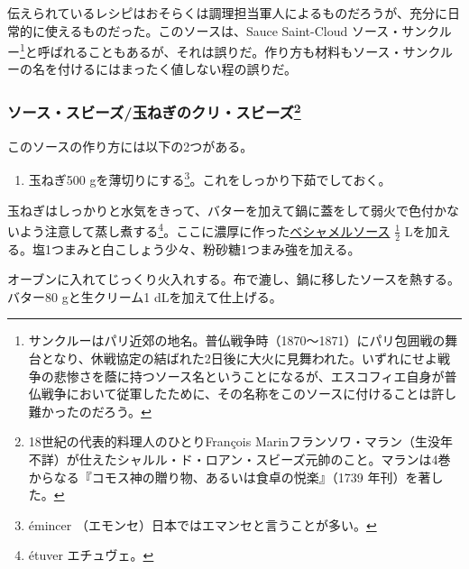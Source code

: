 \begin{recette}
伝えられているレシピはおそらくは調理担当軍人によるものだろうが、充分に日常的に使えるものだった。このソースは、Sauce
Saint-Cloud ソース・サンクルー\footnote{サンクルーはパリ近郊の地名。普仏戦争時（1870〜1871）にパリ包囲戦の舞台となり、休戦協定の結ばれた2日後に大火に見舞われた。いずれにせよ戦争の悲惨さを蔭に持つソース名ということになるが、エスコフィエ自身が普仏戦争において従軍したために、その名称をこのソースに付けることは許し難かったのだろう。}と呼ばれることもあるが、それは誤りだ。作り方も材料もソース・サンクルーの名を付けるにはまったく値しない程の誤りだ。

\atoaki{}

\hypertarget{sauce-soubise}{%
\subsubsection[ソース・スビーズ/玉ねぎのクリ・スビーズ]{\texorpdfstring{ソース・スビーズ/玉ねぎのクリ・スビーズ\footnote{18世紀の代表的料理人のひとりFrançois
  Marinフランソワ・マラン（生没年不詳）が仕えたシャルル・ド・ロアン・スビーズ元帥のこと。マランは4巻からなる『コモス神の贈り物、あるいは食卓の悦楽』（1739
  年刊）を著した。}}{ソース・スビーズ/玉ねぎのクリ・スビーズ}}\label{sauce-soubise}}


 

このソースの作り方には以下の2つがある。

\begin{enumerate}
\def\labelenumi{\arabic{enumi}.}
\tightlist
\item
  玉ねぎ500 gを薄切りにする\footnote{émincer
    （エモンセ）日本ではエマンセと言うことが多い。}。これをしっかり下茹でしておく。
\end{enumerate}

玉ねぎはしっかりと水気をきって、バターを加えて鍋に蓋をして弱火で色付かないよう注意して蒸し煮する\footnote{étuver
  エチュヴェ。}。ここに濃厚に作った\protect\hyperlink{sauce-bechamel}{ベシャメルソース}
\(\frac{1}{2}\)
Lを加える。塩1つまみと白こしょう少々、粉砂糖1つまみ強を加える。

オーブンに入れてじっくり火入れする。布で漉し、鍋に移したソースを熱する。バター80
gと生クリーム1 dLを加えて仕上げる。


\end{recette}
